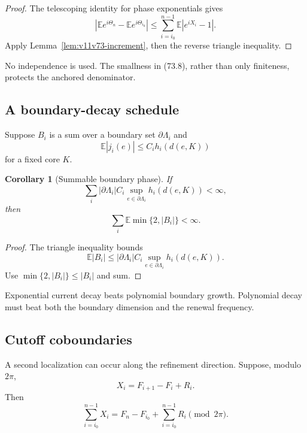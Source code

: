 \documentclass[11pt]{article}
\newtheorem{corollary}[theorem]{Corollary}
\begin{document}
\begin{proof}
The telescoping identity for phase exponentials gives
\[
 |{\mathbb E}e^{i\Theta_n}
       -{\mathbb E}e^{i\Theta_{i_0}}|
 \le\sum_{i=i_0}^{n-1}{\mathbb E}|e^{iX_i}-1|.
\]
Apply Lemma~\ref{lem:v11v73-increment}, then the reverse triangle
inequality.
\end{proof}

No independence is used.  The smallness in (73.8), rather than only
finiteness, protects the anchored denominator.

\subsection{A boundary-decay schedule}

Suppose \(B_i\) is a sum over a boundary set \(\partial\Lambda_i\) and
\[
                         {\mathbb E}|j_i(e)|
                      \le C_i h_i(d(e,K))                    \tag{73.10}
\]
for a fixed core \(K\).

\begin{corollary}[Summable boundary phase]
\label{cor:v11v73-boundary}
If
\[
 \sum_i|\partial\Lambda_i|C_i
       \sup_{e\in\partial\Lambda_i}h_i(d(e,K))<\infty,        \tag{73.11}
\]
then
\[
                         \sum_i{\mathbb E}\min\{2,|B_i|\}
                              <\infty.                         \tag{73.12}
\]
\end{corollary}

\begin{proof}
The triangle inequality bounds
\[
 {\mathbb E}|B_i|
 \le|\partial\Lambda_i|C_i
       \sup_{e\in\partial\Lambda_i}h_i(d(e,K)).
\]
Use \(\min\{2,|B_i|\}\le|B_i|\) and sum.
\end{proof}

Exponential current decay beats polynomial boundary growth.
Polynomial decay must beat both the boundary dimension and the renewal
frequency.

\subsection{Cutoff coboundaries}

A second localization can occur along the refinement direction.
Suppose, modulo \(2\pi\),
\[
                         X_i=F_{i+1}-F_i+R_i.                 \tag{73.13}
\]
Then
\[
                         \sum_{i=i_0}^{n-1}X_i
                 =F_n-F_{i_0}+\sum_{i=i_0}^{n-1}R_i
                              \pmod{2\pi}.                    \tag{73.14}
\]
\end{document}
